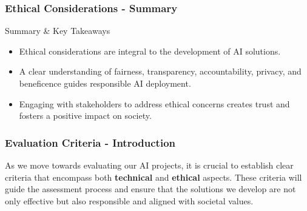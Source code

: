 \documentclass[aspectratio=169]{beamer}
\begin{document}
\begin{frame}[fragile]
    \frametitle{Ethical Considerations - Summary}
    \begin{block}{Summary \& Key Takeaways}
        \begin{itemize}
            \item Ethical considerations are integral to the development of AI solutions.
            \item A clear understanding of fairness, transparency, accountability, privacy, and beneficence guides responsible AI deployment.
            \item Engaging with stakeholders to address ethical concerns creates trust and fosters a positive impact on society.
        \end{itemize}
    \end{block}
\end{frame}

\begin{frame}[fragile]
    \frametitle{Evaluation Criteria - Introduction}
    As we move towards evaluating our AI projects, it is crucial to establish clear criteria that encompass both \textbf{technical} and \textbf{ethical} aspects. 
    These criteria will guide the assessment process and ensure that the solutions we develop are not only effective but also responsible and aligned with societal values.
\end{frame}
\end{document}
